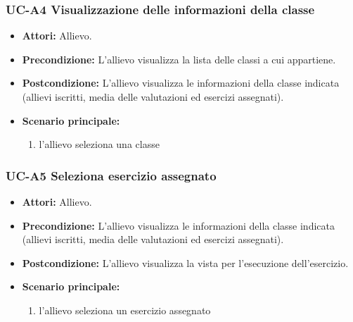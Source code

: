 	\subsubsection{UC-A4 Visualizzazione delle informazioni della classe}
		\begin{itemize}
			\item \textbf{Attori:} Allievo.
			\item \textbf{Precondizione:} L'allievo visualizza la lista delle classi a cui appartiene.
			\item \textbf{Postcondizione:} L'allievo visualizza le informazioni della classe indicata (allievi iscritti, media delle valutazioni ed esercizi assegnati).
			\item \textbf{Scenario principale:}
			\begin{enumerate}
				\item l'allievo seleziona una classe
			\end{enumerate}
		\end{itemize}
		
\subsubsection{UC-A5 Seleziona esercizio assegnato}
\begin{itemize}
			\item \textbf{Attori:} Allievo.
			\item \textbf{Precondizione:} L'allievo visualizza le informazioni della classe indicata (allievi iscritti, media delle valutazioni ed esercizi assegnati).
			\item \textbf{Postcondizione:} L'allievo visualizza la vista per l'esecuzione dell'esercizio.
			\item \textbf{Scenario principale:}
			\begin{enumerate}
				\item l'allievo seleziona un esercizio assegnato
			\end{enumerate}
		\end{itemize}
